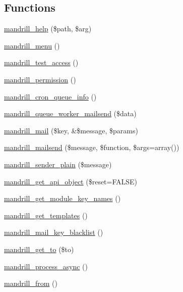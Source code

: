 \subsection*{Functions}
\begin{DoxyCompactItemize}
\item 
\hyperlink{mandrill_8module_a3352d7dded081944f440fae1bebfe334}{mandrill\_\-help} (\$path, \$arg)
\item 
\hyperlink{mandrill_8module_ab717377383339b55b058af1f4bb87fef}{mandrill\_\-menu} ()
\item 
\hyperlink{mandrill_8module_ada3040c948095cdcd2386200335168e7}{mandrill\_\-test\_\-access} ()
\item 
\hyperlink{mandrill_8module_aef9ed053e9f12225ca85eab6d7f93647}{mandrill\_\-permission} ()
\item 
\hyperlink{mandrill_8module_aef3727ae488149f312f6951a77bbf7a9}{mandrill\_\-cron\_\-queue\_\-info} ()
\item 
\hyperlink{mandrill_8module_adc065b54dd9fd629c7eed56053c09cbd}{mandrill\_\-queue\_\-worker\_\-mailsend} (\$data)
\item 
\hyperlink{mandrill_8module_a671b5ea2005ac860f0f0107655b40553}{mandrill\_\-mail} (\$key, \&\$message, \$params)
\item 
\hyperlink{mandrill_8module_a3491d792be9e5ad28ca92986f432f23e}{mandrill\_\-mailsend} (\$message, \$function, \$args=array())
\item 
\hyperlink{mandrill_8module_a654d06cf1990571093c1d45e64267ada}{mandrill\_\-sender\_\-plain} (\$message)
\item 
\hyperlink{mandrill_8module_a26f8a56e226e60202c0070adb37aec01}{mandrill\_\-get\_\-api\_\-object} (\$reset=FALSE)
\item 
\hyperlink{mandrill_8module_a7d8c1a5b8a942d9ba32a286c0d8c337d}{mandrill\_\-get\_\-module\_\-key\_\-names} ()
\item 
\hyperlink{mandrill_8module_a853d6bb3d5652daffe6a14a86c76bac6}{mandrill\_\-get\_\-templates} ()
\item 
\hyperlink{mandrill_8module_ac9823b256c5cfab79f065b345f9aaaa9}{mandrill\_\-mail\_\-key\_\-blacklist} ()
\item 
\hyperlink{mandrill_8module_ac4fe15812a9e519069233d0493339caf}{mandrill\_\-get\_\-to} (\$to)
\item 
\hyperlink{mandrill_8module_a087c8f74e44d40dcb13cbc3072b1cd93}{mandrill\_\-process\_\-async} ()
\item 
\hyperlink{mandrill_8module_afe985bcfaeb96000c36902ece6df9f71}{mandrill\_\-from} ()
\end{DoxyCompactItemize}


